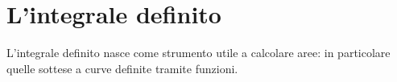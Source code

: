 %
%
%
%


\section{L'integrale definito}
L'integrale definito nasce come strumento utile a calcolare aree: in particolare quelle sottese a curve definite tramite funzioni.

